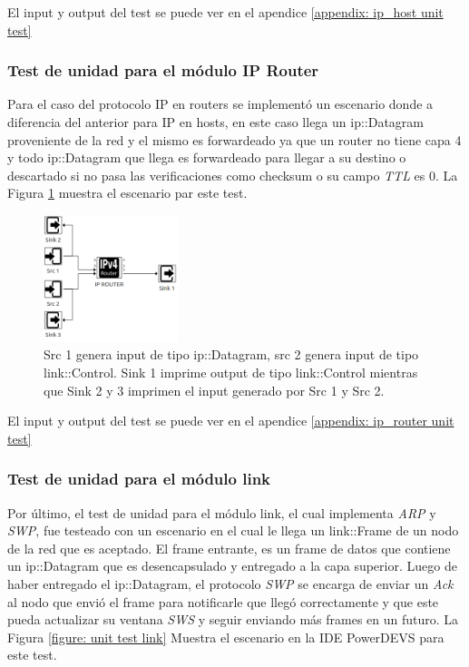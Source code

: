 \documentclass[10pt,a4paper]{article}
\begin{document}
El input y output del test se puede ver en el apendice \ref{appendix: ip_host unit test}

\subsubsection{Test de unidad para el módulo IP Router}

Para el caso del protocolo IP en routers se implementó un escenario donde a diferencia del anterior para IP en hosts, en este caso llega un ip::Datagram proveniente de la red y el mismo es forwardeado ya que un router no tiene capa 4 y todo ip::Datagram que llega es forwardeado para llegar a su destino o descartado si no pasa las verificaciones como checksum o su campo \textit{TTL} es 0. La Figura \ref{figure: unit test ip router} muestra el escenario par este test.\\

\begin{figure}[!thb]
    \centering
    \includegraphics[width = 0.35\textwidth]{img/png/unit_tests/ip_router.png}
    \caption{Src 1 genera input de tipo ip::Datagram, src 2 genera input de tipo link::Control. Sink 1 imprime output de tipo link::Control mientras que Sink 2 y 3 imprimen el input generado por Src 1 y Src 2.}
    \label{figure: unit test ip router}
\end{figure}

El input y output del test se puede ver en el apendice \ref{appendix: ip_router unit test}

\newpage

\subsubsection{Test de unidad para el módulo link}

Por último, el test de unidad para el módulo link, el cual implementa \textit{ARP} y \textit{SWP}, fue testeado con un escenario en el cual le llega un link::Frame de un nodo de la red que es aceptado. El frame entrante, es un frame de datos que contiene un ip::Datagram que es desencapsulado y entregado a la capa superior. Luego de haber entregado el ip::Datagram, el protocolo \textit{SWP} se encarga de enviar un \textit{Ack} al nodo que envió el frame para notificarle que llegó correctamente y que este pueda actualizar su ventana \textit{SWS} y seguir enviando más frames en un futuro. La Figura \ref{figure: unit test link} Muestra el escenario en la IDE PowerDEVS para este test. \\
\end{document}
